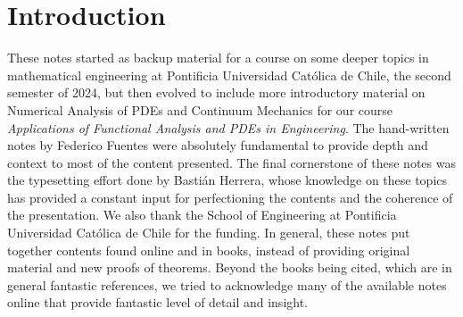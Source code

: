 \section*{Introduction}

These notes started as backup material for a course on some deeper topics in mathematical engineering at Pontificia Universidad Católica de Chile, the second semester of 2024, but then evolved to include more introductory material on Numerical Analysis of PDEs and Continuum Mechanics for our course \emph{Applications of Functional Analysis and PDEs in Engineering}. The hand-written notes by Federico Fuentes were absolutely fundamental to provide depth and context to most of the content presented. The final cornerstone of these notes was the typesetting effort done by Bastián Herrera, whose knowledge on these topics has provided a constant input for perfectioning the contents and the coherence of the presentation. We also thank the School of Engineering at Pontificia Universidad Católica de Chile for the funding. In general, these notes put together contents found online and in books, instead of providing original material and new proofs of theorems. Beyond the books being cited, which are in general fantastic references, we tried to acknowledge many of the available notes online that provide fantastic level of detail and insight.

